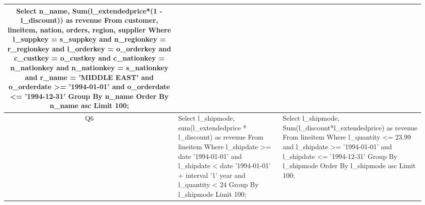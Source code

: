 \begin{center}
\begin{supertabular}{|c|p{7cm}|p{7cm}|}
\footnotesize{Select n\_name, Sum(l\_extendedprice*(1 - l\_discount)) as revenue  From customer, lineitem, nation, orders, region, supplier   Where l\_suppkey = s\_suppkey  and n\_regionkey = r\_regionkey  and l\_orderkey = o\_orderkey  and c\_custkey = o\_custkey  and c\_nationkey = n\_nationkey  and n\_nationkey = s\_nationkey  and r\_name = 'MIDDLE EAST'  and o\_orderdate  >= '1994-01-01' and o\_orderdate <= '1994-12-31'   Group By n\_name   Order By n\_name asc   Limit 100;} \\\hline\footnotesize{Q6} &
\footnotesize{Select l\_shipmode, sum(l\_extendedprice * l\_discount) as revenue From lineitem        Where l\_shipdate >= date '1994-01-01' and l\_shipdate < date '1994-01-01' + interval '1' year and        l\_quantity < 24 Group By l\_shipmode Limit 100;} &
\footnotesize{Select l\_shipmode, Sum(l\_discount*l\_extendedprice) as revenue  From lineitem   Where l\_quantity  <= 23.99  and l\_shipdate  >= '1994-01-01' and l\_shipdate <= '1994-12-31'   Group By l\_shipmode   Order By l\_shipmode asc   Limit 100;} \\\hline\end{supertabular}
\label{result:basic}\end{center}
\twocolumn